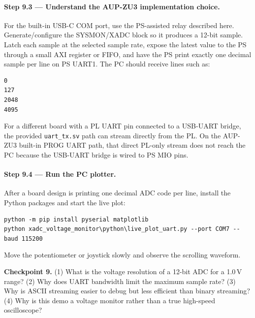 \paragraph{Step 9.3 --- Understand the AUP-ZU3 implementation choice.}
For the built-in USB-C COM port, use the PS-assisted relay described here. Generate/configure the
SYSMON/XADC block so it produces a 12-bit sample. Latch each sample at the selected sample rate, expose
the latest value to the PS through a small AXI register or FIFO, and have the PS print exactly one
decimal sample per line on PS UART1. The PC should receive lines such as:
\begin{lstlisting}[style=plain]
0
127
2048
4095
\end{lstlisting}
For a different board with a PL UART pin connected to a USB-UART bridge, the provided \texttt{uart\_tx.sv}
path can stream directly from the PL. On the AUP-ZU3 built-in PROG UART path, that direct PL-only stream
does not reach the PC because the USB-UART bridge is wired to PS MIO pins.

\paragraph{Step 9.4 --- Run the PC plotter.}
After a board design is printing one decimal ADC code per line, install the Python packages and start
the live plot:
\begin{lstlisting}[style=ps]
python -m pip install pyserial matplotlib
python xadc_voltage_monitor\python\live_plot_uart.py --port COM7 --baud 115200
\end{lstlisting}
Move the potentiometer or joystick slowly and observe the scrolling waveform.

\begin{questionbox}
\textbf{Checkpoint 9.} (1) What is the voltage resolution of a 12-bit ADC for a 1.0\,V range?
(2) Why does UART bandwidth limit the maximum sample rate? (3) Why is ASCII streaming easier to debug
but less efficient than binary streaming? (4) Why is this demo a voltage monitor rather than a true
high-speed oscilloscope?
\end{questionbox}
